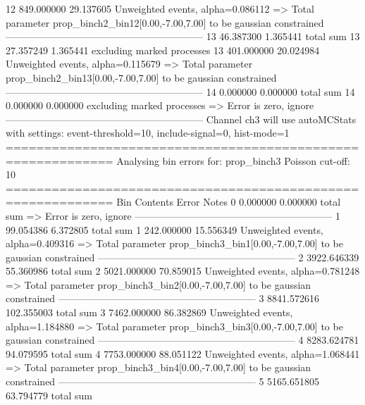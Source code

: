 12         849.000000      29.137605       Unweighted events, alpha=0.086112
  => Total parameter prop_binch2_bin12[0.00,-7.00,7.00] to be gaussian constrained
------------------------------------------------------------
13         46.387300       1.365441        total sum                     
13         27.357249       1.365441        excluding marked processes    
13         401.000000      20.024984       Unweighted events, alpha=0.115679
  => Total parameter prop_binch2_bin13[0.00,-7.00,7.00] to be gaussian constrained
------------------------------------------------------------
14         0.000000        0.000000        total sum                     
14         0.000000        0.000000        excluding marked processes    
  => Error is zero, ignore      
------------------------------------------------------------
Channel ch3 will use autoMCStats with settings: event-threshold=10, include-signal=0, hist-mode=1
============================================================
Analysing bin errors for: prop_binch3
Poisson cut-off: 10
============================================================
Bin        Contents        Error           Notes                         
0          0.000000        0.000000        total sum                     
  => Error is zero, ignore      
------------------------------------------------------------
1          99.054386       6.372805        total sum                     
1          242.000000      15.556349       Unweighted events, alpha=0.409316
  => Total parameter prop_binch3_bin1[0.00,-7.00,7.00] to be gaussian constrained
------------------------------------------------------------
2          3922.646339     55.360986       total sum                     
2          5021.000000     70.859015       Unweighted events, alpha=0.781248
  => Total parameter prop_binch3_bin2[0.00,-7.00,7.00] to be gaussian constrained
------------------------------------------------------------
3          8841.572616     102.355003      total sum                     
3          7462.000000     86.382869       Unweighted events, alpha=1.184880
  => Total parameter prop_binch3_bin3[0.00,-7.00,7.00] to be gaussian constrained
------------------------------------------------------------
4          8283.624781     94.079595       total sum                     
4          7753.000000     88.051122       Unweighted events, alpha=1.068441
  => Total parameter prop_binch3_bin4[0.00,-7.00,7.00] to be gaussian constrained
------------------------------------------------------------
5          5165.651805     63.794779       total sum                     
